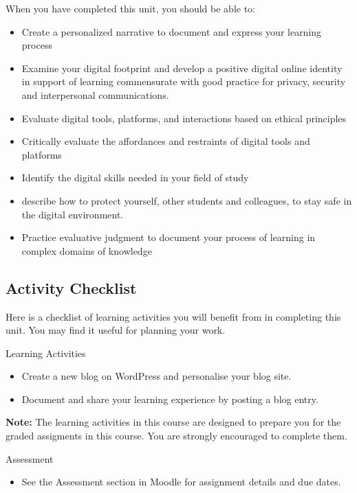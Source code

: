 \documentclass[
]{book}
\providecommand{\tightlist}{%
  \setlength{\itemsep}{0pt}\setlength{\parskip}{0pt}}
\theoremstyle{definition}
\theoremstyle{definition}
\theoremstyle{definition}
\theoremstyle{definition}
\theoremstyle{remark}
\begin{document}
When you have completed this unit, you should be able to:

\begin{itemize}
\tightlist
\item
  Create a personalized narrative to document and express your learning process
\item
  Examine your digital footprint and develop a positive digital online identity in support of learning commensurate with good practice for privacy, security and interpersonal communications.
\item
  Evaluate digital tools, platforms, and interactions based on ethical principles
\item
  Critically evaluate the affordances and restraints of digital tools and platforms
\item
  Identify the digital skills needed in your field of study
\item
  describe how to protect yourself, other students and colleagues, to stay safe in the digital environment.
\item
  Practice evaluative judgment to document your process of learning in complex domains of knowledge
\end{itemize}

\hypertarget{activity-checklist-3}{%
\subsection*{Activity Checklist}\label{activity-checklist-3}}

Here is a checklist of learning activities you will benefit from in completing this unit. You may find it useful for planning your work.

\begin{reflect}
{Learning Activities}

\begin{itemize}
\tightlist
\item
  Create a new blog on WordPress and personalise your blog site.
\item
  Document and share your learning experience by posting a blog entry.
\end{itemize}

\textbf{Note:} The learning activities in this course are designed to prepare you for the graded assigments in this course. You are strongly encouraged to complete them.
\end{reflect}

\begin{assessment}
{Assessment}

\begin{itemize}
\tightlist
\item
  See the Assessment section in Moodle for assignment details and due dates.
\end{itemize}
\end{assessment}
\end{document}
